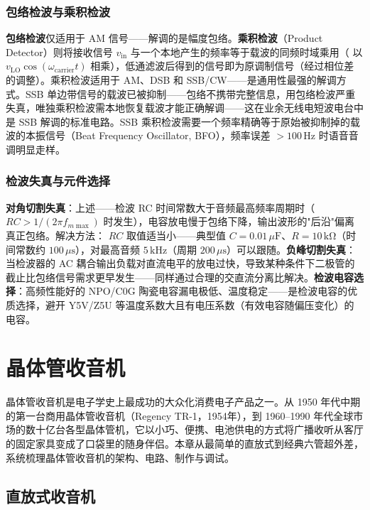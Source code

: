 \documentclass[12pt,UTF8]{ctexbook}
\begin{document}
\subsection{包络检波与乘积检波}

\textbf{包络检波}仅适用于 AM 信号——解调的是幅度包络。\textbf{乘积检波}（Product Detector）则将接收信号 $v_{\text{in}}$ 与一个本地产生的频率等于载波的同频时域乘用（ 以 $v_{\text{LO}}\cos(\omega_{\text{carrier}}t)$ 相乘），低通滤波后得到的信号即为原调制信号（经过相位差的调整）。乘积检波适用于 AM、DSB 和 SSB/CW——是通用性最强的解调方式。SSB 单边带信号的载波已被抑制——包络不携带完整信息，用包络检波严重失真，唯独乘积检波需本地恢复载波才能正确解调——这在业余无线电短波电台中是 SSB 解调的标准电路。SSB 乘积检波需要一个频率精确等于原始被抑制掉的载波的本振信号（Beat Frequency Oscillator, BFO），频率误差 $>100\,\mathrm{Hz}$ 时语音音调明显走样。

\subsection{检波失真与元件选择}

\textbf{对角切割失真}：上述——检波 RC 时间常数大于音频最高频率周期时（$R C > 1/(2\pi f_{m\max})$ 时发生），电容放电慢于包络下降，输出波形的"后沿"偏离真正包络。解决方法： $R C$ 取值适当小——典型值 $C=0.01\,\mu\mathrm{F}$、$R=10\,\mathrm{k\Omega}$（时间常数约 $100\,\mu\mathrm{s}$），对最高音频 $5\,\mathrm{kHz}$（周期 $200\,\mu\mathrm{s}$）可以跟随。\textbf{负峰切割失真}：当检波器的 AC 耦合输出负载对直流电平的放电过快，导致某种条件下二极管的截止比包络信号需求更早发生——同样通过合理的交直流分离比解决。\textbf{检波电容选择}：高频性能好的 NPO/C0G 陶瓷电容漏电极低、温度稳定——是检波电容的优质选择，避开 Y5V/Z5U 等温度系数大且有电压系数（有效电容随偏压变化）的电容。


\chapter{晶体管收音机}
\label{chap:transistor_radio}

晶体管收音机是电子学史上最成功的大众化消费电子产品之一。从 1950 年代中期的第一台商用晶体管收音机（Regency TR-1，1954年），到 1960–1990 年代全球市场的数十亿台各型晶体管机，它以小巧、便携、电池供电的方式将广播收听从客厅的固定家具变成了口袋里的随身伴侣。本章从最简单的直放式到经典六管超外差，系统梳理晶体管收音机的架构、电路、制作与调试。

\section{直放式收音机}
\label{sec:trf_radio}
\end{document}
